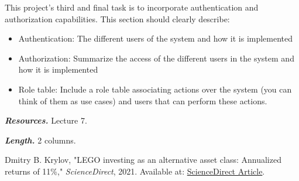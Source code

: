 \documentclass[letterpaper,twocolumn]{article}
\newcommand{\myparagraph}[1]{\vspace{0.1cm}\noindent \textbf{\textit{#1.}}}
\begin{document}
This project's third and final task is to incorporate authentication and authorization capabilities.
This section should clearly describe:

\begin{itemize}
    \item Authentication: The different users of the system and how it is implemented
    \item Authorization: Summarize the access of the different users in the system and how it is implemented
    \item Role table: Include a role table associating actions over the system (you can think of them as use cases) and users that can perform these actions.
\end{itemize}

\myparagraph{Resources} Lecture 7.

\myparagraph{Length} 2 columns.




\begin{thebibliography}{9}
    
    Dmitry B. Krylov, "LEGO investing as an alternative asset class: Annualized returns of 11\%," 
    \textit{ScienceDirect}, 2021. Available at: \href{https://www.sciencedirect.com/science/article/abs/pii/S0275531921001604?via%3Dihub}{ScienceDirect Article}.
    
\end{thebibliography}
\end{document}

